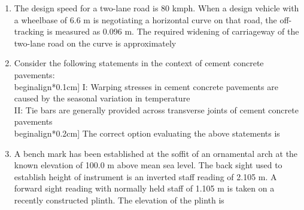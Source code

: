 \documentclass[journal,12pt,onecolumn]{IEEEtran}
\theoremstyle{remark}
\begin{document}
\begin{enumerate}
\noindent\item The design speed for a two-lane road is 80 kmph. When a design vehicle with a wheelbase of 6.6 m is negotiating a horizontal curve on that road, the off-tracking is measured as 0.096 m. The required widening of carriageway of the two-lane road on the curve is approximately
\\ \hfill{}
\begin{enumerate}
\end{enumerate}
\noindent\item Consider the following statements in the context of cement concrete pavements: \\begin{align*}0.1cm]
I: Warping stresses in cement concrete pavements are caused by the seasonal variation in temperature \\ 
II: Tie bars are generally provided across transverse joints of cement concrete pavements \\begin{align*}0.2cm]
The correct option evaluating the above statements is
\hfill{}
\begin{enumerate}
\end{enumerate}
\noindent\item A bench mark has been established at the soffit of an ornamental arch at the known elevation of 100.0 m above mean sea level. The back sight used to establish height of instrument is an inverted staff reading of 2.105 m. A forward sight reading with normally held staff of 1.105 m is taken on a recently constructed plinth. The elevation of the plinth is

\setlength{\parskip}{0.5cm}

\hfill{}
\begin{enumerate}
\end{enumerate}


\end{enumerate}
\end{document}
